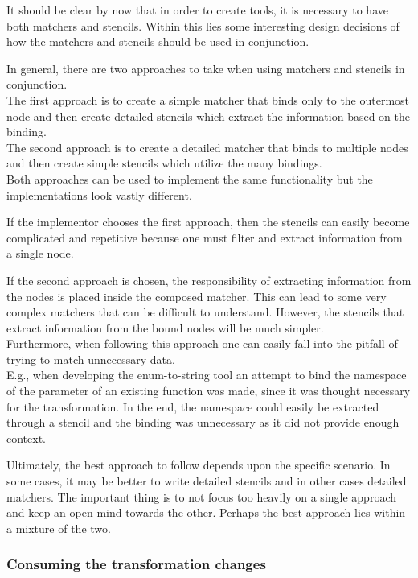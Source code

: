 It should be clear by now that in order to create tools, it is necessary to have both matchers and stencils. Within this lies some interesting design decisions of how the matchers and stencils should be used in conjunction.

In general, there are two approaches to take when using matchers and stencils in conjunction.\\
The first approach is to create a simple matcher that binds only to the outermost node and then create detailed stencils which extract the information based on the binding.\\
The second approach is to create a detailed matcher that binds to multiple nodes and then create simple stencils which utilize the many bindings.\\
Both approaches can be used to implement the same functionality but the implementations look vastly different.

If the implementor chooses the first approach, then the stencils can easily become complicated and repetitive because one must filter and extract information from a single node.

If the second approach is chosen, the responsibility of extracting information from the nodes is placed inside the composed matcher. This can lead to some very complex matchers that can be difficult to understand. However, the stencils that extract information from the bound nodes will be much simpler.\\
Furthermore, when following this approach one can easily fall into the pitfall of trying to match unnecessary data.\\
E.g., when developing the enum-to-string tool an attempt to bind the namespace of the parameter of an existing  function was made, since it was thought necessary for the transformation. In the end, the namespace could easily be extracted through a stencil and the binding was unnecessary as it did not provide enough context.

Ultimately, the best approach to follow depends upon the specific scenario. In some cases, it may be better to write detailed stencils and in other cases detailed matchers. The important thing is to not focus too heavily on a single approach and keep an open mind towards the other. Perhaps the best approach lies within a mixture of the two.

\subsubsection*{Consuming the transformation changes} \label{subsubsec:080dev:Consumers}

